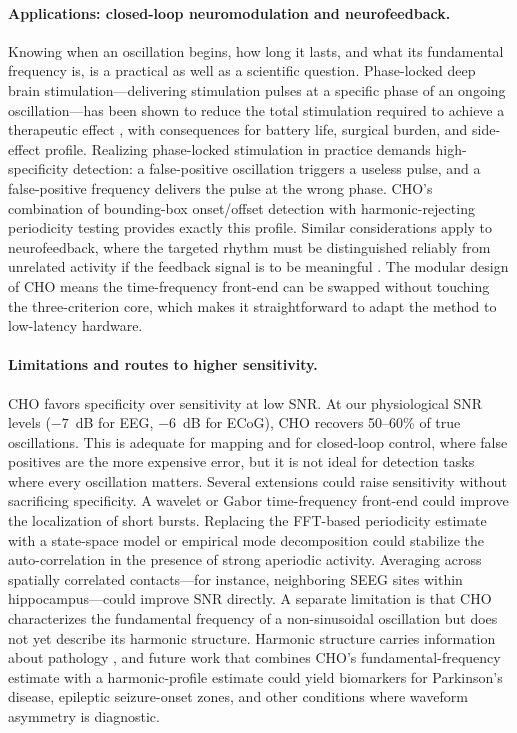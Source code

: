 \documentclass[11pt]{article}
\begin{document}
\paragraph{Applications: closed-loop neuromodulation and neurofeedback.}
Knowing when an oscillation begins, how long it lasts, and what its fundamental frequency is, is a practical as well as a scientific question. Phase-locked deep brain stimulation---delivering stimulation pulses at a specific phase of an ongoing oscillation---has been shown to reduce the total stimulation required to achieve a therapeutic effect \citep{cagnan2017phase}, with consequences for battery life, surgical burden, and side-effect profile. Realizing phase-locked stimulation in practice demands high-specificity detection: a false-positive oscillation triggers a useless pulse, and a false-positive frequency delivers the pulse at the wrong phase. CHO's combination of bounding-box onset/offset detection with harmonic-rejecting periodicity testing provides exactly this profile. Similar considerations apply to neurofeedback, where the targeted rhythm must be distinguished reliably from unrelated activity if the feedback signal is to be meaningful \citep{jensen2010shaping}. The modular design of CHO means the time-frequency front-end can be swapped without touching the three-criterion core, which makes it straightforward to adapt the method to low-latency hardware.

\paragraph{Limitations and routes to higher sensitivity.}
CHO favors specificity over sensitivity at low SNR. At our physiological SNR levels ($-7$~dB for EEG, $-6$~dB for ECoG), CHO recovers 50--60\% of true oscillations. This is adequate for mapping and for closed-loop control, where false positives are the more expensive error, but it is not ideal for detection tasks where every oscillation matters. Several extensions could raise sensitivity without sacrificing specificity. A wavelet or Gabor time-frequency front-end could improve the localization of short bursts. Replacing the FFT-based periodicity estimate with a state-space model or empirical mode decomposition \citep{quinn2021within} could stabilize the auto-correlation in the presence of strong aperiodic activity. Averaging across spatially correlated contacts---for instance, neighboring SEEG sites within hippocampus---could improve SNR directly. A separate limitation is that CHO characterizes the fundamental frequency of a non-sinusoidal oscillation but does not yet describe its harmonic structure. Harmonic structure carries information about pathology \citep{cole2017waveform}, and future work that combines CHO's fundamental-frequency estimate with a harmonic-profile estimate could yield biomarkers for Parkinson's disease, epileptic seizure-onset zones, and other conditions where waveform asymmetry is diagnostic.
\end{document}
